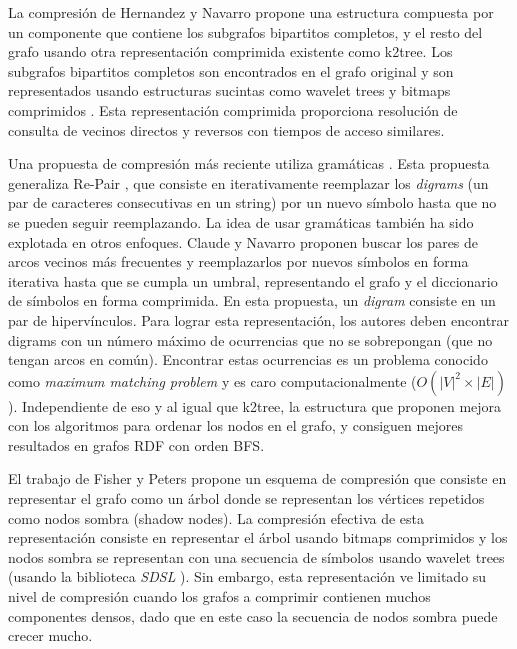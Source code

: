 La compresión de Hernandez y Navarro \cite{hernandez2012compressed} propone una estructura compuesta por un componente que contiene los subgrafos bipartitos completos, y el resto del grafo usando otra representación comprimida existente como k2tree. Los subgrafos bipartitos completos son encontrados en el grafo original y son representados usando estructuras sucintas como wavelet trees y bitmaps comprimidos \cite{gbmp2014sea}. Esta representación comprimida proporciona resolución de consulta de vecinos directos y reversos con tiempos de acceso similares.

Una propuesta de compresión más reciente utiliza gramáticas \cite{maneth2016compressing}. Esta propuesta generaliza Re-Pair \cite{larsson2000off}, que consiste en iterativamente reemplazar los \textit{digrams} (un par de caracteres consecutivas en un string) por un nuevo símbolo hasta que no se pueden seguir reemplazando. La idea de usar gramáticas también ha sido explotada en otros enfoques. Claude y Navarro \cite{claude2010fast} proponen buscar los pares de arcos vecinos más frecuentes y reemplazarlos por nuevos símbolos en forma iterativa hasta que se cumpla un umbral, representando el grafo y el diccionario de símbolos en forma comprimida. En esta propuesta, un \textit{digram} consiste en un par de hipervínculos. Para lograr esta representación, los autores deben encontrar digrams con un número máximo de ocurrencias que no se sobrepongan (que no tengan arcos en común). Encontrar estas ocurrencias es un problema conocido como \textit{maximum matching problem} y es caro computacionalmente ($O(|V|^2\times |E|)$). Independiente de eso y al igual que k2tree, la estructura que proponen mejora con los algoritmos para ordenar los nodos en el grafo, y consiguen mejores resultados en grafos RDF con orden BFS.


El trabajo de Fisher y Peters \cite{FISCHER201639} propone un esquema de compresión que consiste en representar el grafo como un árbol donde se representan los vértices repetidos como nodos sombra (shadow nodes). La compresión efectiva de esta representación consiste en representar el árbol usando bitmaps comprimidos y los nodos sombra se representan con una secuencia de símbolos usando wavelet trees (usando la biblioteca \textit{SDSL} \cite{gbmp2014sea}). Sin embargo, esta representación ve limitado su nivel de compresión cuando los grafos a comprimir contienen muchos componentes densos, dado que en este caso la secuencia de nodos sombra puede crecer mucho.   

